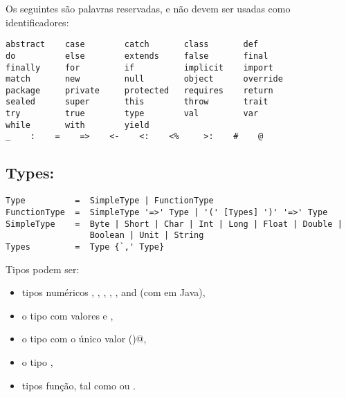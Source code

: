 Os seguintes s\~{a}o palavras reservadas, e n\~{a}o devem ser usadas como identificadores:
\begin{lstlisting}
abstract    case        catch       class       def    
do          else        extends     false       final    
finally     for         if          implicit    import      
match       new         null        object      override    
package     private     protected   requires    return      
sealed      super       this        throw       trait
try         true        type        val         var         
while       with        yield
_    :    =    =>    <-    <:    <%     >:    #    @
\end{lstlisting}

\subsection*{Types:}

\begin{lstlisting}
Type          =  SimpleType | FunctionType
FunctionType  =  SimpleType '=>' Type | '(' [Types] ')' '=>' Type
SimpleType    =  Byte | Short | Char | Int | Long | Float | Double |
                 Boolean | Unit | String
Types         =  Type {`,' Type}
\end{lstlisting}

Tipos podem ser:
 \begin{itemize}
 \item tipos num\'{e}ricos , , , , ,  and  (com em Java),
 \item o tipo  com valores   e ,
 \item o tipo  com o \'{u}nico valor  \lstinline@()@,
 \item o tipo ,
 \item tipos fun\c{c}\~{a}o, tal como   ou .
 \end{itemize}

